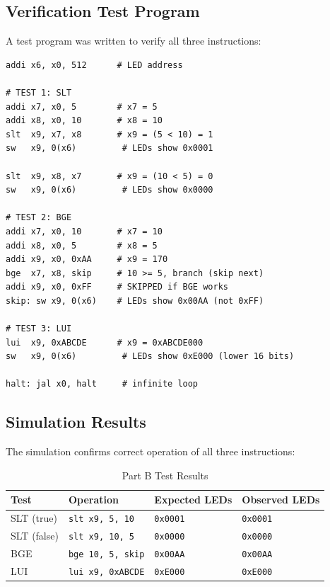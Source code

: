 \documentclass[12pt,a4paper]{article}
\begin{document}
\subsection{Verification Test Program}
A test program was written to verify all three instructions:

\begin{lstlisting}[style=asm, caption={Test program for new instructions}]
addi x6, x0, 512      # LED address

# TEST 1: SLT
addi x7, x0, 5        # x7 = 5
addi x8, x0, 10       # x8 = 10
slt  x9, x7, x8       # x9 = (5 < 10) = 1
sw   x9, 0(x6)         # LEDs show 0x0001

slt  x9, x8, x7       # x9 = (10 < 5) = 0
sw   x9, 0(x6)         # LEDs show 0x0000

# TEST 2: BGE
addi x7, x0, 10       # x7 = 10
addi x8, x0, 5        # x8 = 5
addi x9, x0, 0xAA     # x9 = 170
bge  x7, x8, skip     # 10 >= 5, branch (skip next)
addi x9, x0, 0xFF     # SKIPPED if BGE works
skip: sw x9, 0(x6)    # LEDs show 0x00AA (not 0xFF)

# TEST 3: LUI
lui  x9, 0xABCDE      # x9 = 0xABCDE000
sw   x9, 0(x6)         # LEDs show 0xE000 (lower 16 bits)

halt: jal x0, halt     # infinite loop
\end{lstlisting}

\subsection{Simulation Results}
The simulation confirms correct operation of all three instructions:
\begin{table}[h]
\centering
\caption{Part B Test Results}
\begin{tabular}{@{}llll@{}}
\toprule
\textbf{Test} & \textbf{Operation} & \textbf{Expected LEDs} & \textbf{Observed LEDs} \\
\midrule
SLT (true)  & \texttt{slt x9, 5, 10}    & \texttt{0x0001} & \texttt{0x0001} \\
SLT (false) & \texttt{slt x9, 10, 5}    & \texttt{0x0000} & \texttt{0x0000} \\
BGE         & \texttt{bge 10, 5, skip}   & \texttt{0x00AA} & \texttt{0x00AA} \\
LUI         & \texttt{lui x9, 0xABCDE}   & \texttt{0xE000} & \texttt{0xE000} \\
\bottomrule
\end{tabular}
\end{table}
\end{document}
